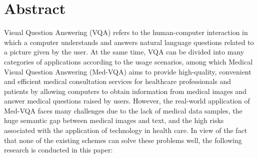 	


\chapter{Abstract}
Visual Question Answering (VQA) refers to the human-computer interaction in which a computer understands and answers natural language questions related to a picture given by the user.
At the same time, VQA can be divided into many categories of applications according to the usage scenarios, among which Medical Visual Question Answering (Med-VQA) aims to provide high-quality, convenient and efficient medical consultation services for healthcare professionals and patients by allowing computers to obtain information from medical images and answer medical questions raised by users.
However, the real-world application of Med-VQA faces many challenges due to the lack of medical data samples, the huge semantic gap between medical images and text, and the high risks associated with the application of technology in health care. In view of the fact that none of the existing schemes can solve these problems well, the following research is conducted in this paper:

